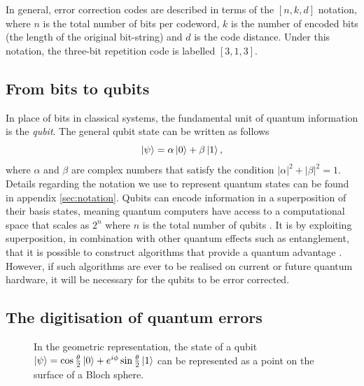\documentclass[]{arxiv}
\theoremstyle{plain}%
\theoremstyle{definition}
\theoremstyle{remark}
\begin{document}
In general, error correction codes are described in terms of the $[n,k,d]$ notation, where $n$ is the total number of bits per codeword, $k$ is the number of encoded bits (the length of the original bit-string) and $d$ is the code distance. Under this notation, the three-bit repetition code is labelled $[3,1,3]$.




\subsection{From bits to qubits}

In place of bits in classical systems, the fundamental unit of quantum information is the \textit{qubit}. The general qubit state can be written as follows
%
\begin{equation}\label{eq:qubit_gen_state}
\ket{\psi} = \alpha \ket{0} + \beta\ket{1}\rm,
\end{equation}
%
where $\alpha$ and $\beta$ are complex numbers that satisfy the condition $|\alpha |^2 + |\beta|^2 =1$. Details regarding the notation we use to represent quantum states can be found in appendix \ref{sec:notation}. Qubits can encode information in a superposition of their basis states, meaning quantum computers have access to a computational space that scales as $2^n$ where $n$ is the total number of qubits \cite{Nielsen2010}. It is by exploiting superposition, in combination with other quantum effects such as entanglement, that it is possible to construct algorithms that provide a quantum advantage \cite{Shor97,Grover96}. However, if such algorithms are ever to be realised on current or future quantum hardware, it will be necessary for the qubits to be error corrected. 



\subsection{The digitisation of quantum errors}\label{sec:digitisation}

\begin{figure}
	\centering
	
	\caption{In the geometric representation, the state of a qubit $\ket{\psi}=\cos{\frac{\theta}{2}}\ket{0}+e^{i\phi}\sin{\frac{\theta}{2}}\ket{1}$ can be represented as a point on the surface of a Bloch sphere.}
	\label{fig:bloch}
\end{figure}
\end{document}
